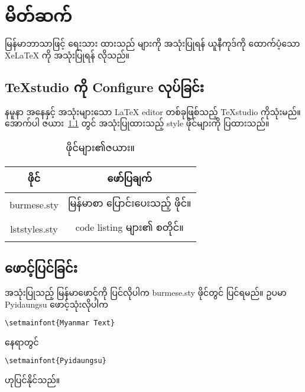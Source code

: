 \chapter{မိတ်ဆက်}
\label{ch:Introduction}

မြန်မာဘာသာဖြင့် ရေးသား ထားသည် များကို အသုံးပြုရန် ယူနီကုဒ်ကို ထောက်ပံ့သော XeLaTeX ကို အသုံးပြုရန် လိုသည်။ 
\section{TeXstudio ကို Configure လုပ်ခြင်း}

နမူနာ အနေနှင့် အသုံးများသော LaTeX editor တစ်ခုဖြစ်သည့် TeXstudio ကိုသုံးမည်။
အောက်ပါ ဇယား~\ref{tbl_eg} တွင် အသုံးပြုထားသည့် style ဖိုင်များကို ပြထားသည်။

\begin{table}[h]\footnotesize
	\centering	
	\caption{ဖိုင်များ၏ဇယား။}
\begin{tabular}{| c | c | }	
	\hline
	ဖိုင်  & ဖော်ပြချက် \\
	\hline
	burmese.sty & မြန်မာစာ ပြောင်းပေးသည့် ဖိုင်။  \\
	\hline
	lststyles.sty & code listing များ၏ စတိုင်။  \\
	\hline
\end{tabular}
	\label{tbl_eg}
\end{table}

\section{ဖောင့်ပြင်ခြင်း}

အသုံးပြုသည့် မြန်မာဖောင့်ကို ပြင်လိုပါက burmese.sty ဖိုင်တွင် ပြင်ရမည်။
 ဥပမာ Pyidaungsu ဖောင့်သုံးလိုပါက
\begin{lstlisting}[style=myTeX,caption={မူရင်ဖောင့် သတ်မှတ်ချက်။},label={lstMTFont}]
\setmainfont{Myanmar Text}
\end{lstlisting}
 နေရာတွင်
\begin{lstlisting}[style=myTeX,caption={ဖောင့်အမည်ကိုပြင်ခြင်း။},label={lstPDFont}]
\setmainfont{Pyidaungsu}
\end{lstlisting}
 ဟုပြင်နိုင်သည်။ 
